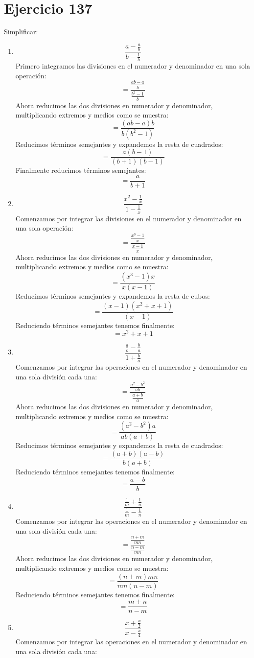 \documentclass[12pt]{article}
\begin{document}
\section*{Ejercicio 137}
Simplificar:
\begin{enumerate}[label=\bfseries Ejercicio \arabic*:]
  \item $$\frac{a - \frac{a}{b}}{b - \frac{1}{b}}$$
Primero integramos las divisiones en el numerador y denominador en una sola operación:
$$= \frac{\frac{ab - a}{b}}{\frac{b^2 - 1}{b}}$$
Ahora reducimos las dos divisiones en numerador y denominador, multiplicando extremos y medios como se muestra:
$$= \frac{(ab - a)b}{b(b^2 - 1)}$$
Reducimos términos semejantes y expandemos la resta de cuadrados:
$$= \frac{a(b - 1)}{(b + 1)(b - 1)}$$
Finalmente reducimos términos semejantes:
$$= \frac{a}{b + 1}$$
 \item $$\frac{x^2 - \frac{1}{x}}{1 - \frac{1}{x}}$$
Comenzamos por integrar las divisiones en el numerador y denominador en una sola operación:
$$= \frac{\frac{x^3 - 1}{x}}{\frac{x - 1}{x}}$$
Ahora reducimos las dos divisiones en numerador y denominador, multiplicando extremos y medios como se muestra:
$$= \frac{(x^3 - 1)x}{x(x - 1)}$$
Reducimos términos semejantes y expandemos la resta de cubos:
$$= \frac{(x - 1)(x^2 + x +1)}{(x - 1)}$$
Reduciendo términos semejantes tenemos finalmente:
$$= x^2 + x +1$$
  \item $$\frac{\frac{a}{b} - \frac{b}{a}}{1 + \frac{b}{a}}$$
Comenzamos por integrar las operaciones en el numerador y denominador en una sola división cada una:
$$= \frac{\frac{a^2 - b^2}{ab}}{\frac{a + b}{a}}$$
Ahora reducimos las dos divisiones en numerador y denominador, multiplicando extremos y medios como se muestra:
$$= \frac{(a^2 - b^2)a}{ab(a + b)}$$
Reducimos términos semejantes y expandemos la resta de cuadrados:
$$= \frac{(a + b)(a - b)}{b(a + b)}$$
Reduciendo términos semejantes tenemos finalmente:
$$= \frac{a - b}{b}$$
\item $$\frac{\frac{1}{m} + \frac{1}{n}}{\frac{1}{m} - \frac{1}{n}}$$
Comenzamos por integrar las operaciones en el numerador y denominador en una sola división cada una:
$$= \frac{\frac{n + m}{mn}}{\frac{n - m}{mn}}$$
Ahora reducimos las dos divisiones en numerador y denominador, multiplicando extremos y medios como se muestra:
$$= \frac{(n + m)mn}{mn(n-m)}$$
Reduciendo términos semejantes tenemos finalmente:
$$= \frac{m + n}{n-m}$$
  \item $$\frac{x + \frac{x}{2}}{x - \frac{x}{4}}$$
Comenzamos por integrar las operaciones en el numerador y denominador en una sola división cada una:

\end{enumerate}
\end{document}
